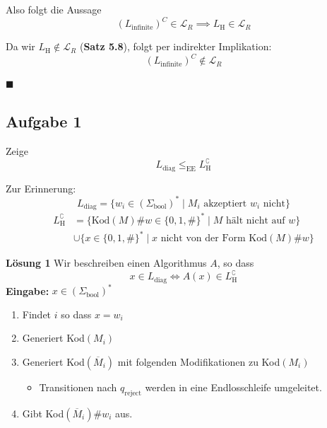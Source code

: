 \documentclass[a4paper, 11pt]{article}
\def\L{\mathcal{L}}
\newcommand\myTitle[1]{{\large \textbf {#1}}}
\begin{document}
                    Also folgt die Aussage
                    $$(L_{\text{infinite}})^C \in \L_R \implies L_{\text{H}} \in \L_R$$
                
                    Da wir $L_{\text{H}} \notin \L_R$ (\textbf{Satz 5.8}), folgt per indirekter Implikation:
                    $$(L_{\text{infinite}})^C \notin \L_R$$
                
                    \hspace*{0pt}\hfill$\blacksquare$

                    
                        \subsection{Aufgabe 1}
                        Zeige 
                        $$L_{\text{diag}} \leq_{\text{EE}} L_{\text{H}}^\complement$$
                        
                        Zur Erinnerung:
                        $$L_{\text{diag}} = \{w_i \in (\Sigma_{\text{bool}})^* \mid M_i \text{ akzeptiert } w_i \text{ nicht}\}$$
                        \begin{align*}
                            L_{\text{H}}^\complement &= \{\text{Kod}(M)\#w \in \{0,1 , \#\}^* \mid M \text{ hält nicht auf }w\}\\
                                                    & \cup \{x \in \{0, 1, \#\}^* \mid x \text{ nicht von der Form Kod}(M)\#w\}
                        \end{align*}
                    
                    
                    
                        \myTitle{Lösung 1}
                        Wir beschreiben einen Algorithmus $A$, so dass 
                        $$x \in L_{\text{diag}} \iff A(x) \in L_{\text{H}}^\complement$$
                        \textbf{Eingabe:} $x \in (\Sigma_{\text{bool}})^*$
                        
                        \begin{enumerate}[label=\arabic*.]
                            \item Findet $i$ so dass $x = w_i$
                            \item Generiert Kod$(M_i)$
                            \item Generiert Kod$(\overline{M}_i)$ mit folgenden Modifikationen zu Kod$(M_i)$
                            
                            \begin{itemize}[label=-]
                                \item Transitionen nach $q_{\text{reject}}$ werden in eine Endlosschleife umgeleitet.
                            \end{itemize}
                            \item Gibt Kod$(\overline{M}_i)\#w_i$ aus.
                        \end{enumerate}
                
\end{document}
